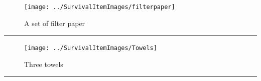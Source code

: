 \documentclass{article}
\begin{document}
    \begin{figure}[H]
        \centering
        \begin{minipage}{0.25\textwidth}
            \centering
            \texttt{[image: ../SurvivalItemImages/filterpaper]}
        \end{minipage}\hfill
        \begin{minipage}{0.7\textwidth}
            \centering
            \Large A set of filter paper
        \end{minipage}
    \end{figure}
    \vspace{-0.8em}
    \noindent\rule{\textwidth}{0.4pt}
            
    \begin{figure}[H]
        \centering
        \begin{minipage}{0.25\textwidth}
            \centering
            \texttt{[image: ../SurvivalItemImages/Towels]}
        \end{minipage}\hfill
        \begin{minipage}{0.7\textwidth}
            \centering
            \Large Three towels
        \end{minipage}
    \end{figure}
    \vspace{-0.8em}
    \noindent\rule{\textwidth}{0.4pt}
            
\end{document}
